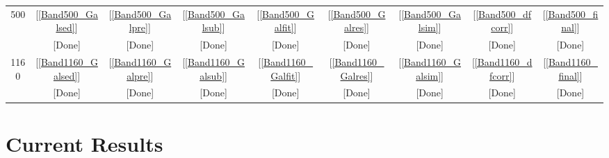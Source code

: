 \documentclass[11pt,a4paper]{article}
\begin{document}
\begin{table}[h]
\begin{tabular}{ccccccccc}
		500 & [\ref{Band500_Galsed}] & [\ref{Band500_Galpre}] & [\ref{Band500_Galsub}] & [\ref{Band500_Galfit}] & [\ref{Band500_Galres}] & [\ref{Band500_Galsim}] & [\ref{Band500_dfcorr}] & [\ref{Band500_final}] \\
		& \textcolor{green!50!black}{[Done]} & \textcolor{green!50!black}{[Done]} & \textcolor{green!50!black}{[Done]} & \textcolor{green!50!black}{[Done]} & \textcolor{green!50!black}{[Done]} & \textcolor{green!50!black}{[Done]} & \textcolor{green!50!black}{[Done]} & \textcolor{green!50!black}{[Done]} \\
		1160 & [\ref{Band1160_Galsed}] & [\ref{Band1160_Galpre}] & [\ref{Band1160_Galsub}] & [\ref{Band1160_Galfit}] & [\ref{Band1160_Galres}] & [\ref{Band1160_Galsim}] & [\ref{Band1160_dfcorr}] & [\ref{Band1160_final}] \\
		& \textcolor{green!50!black}{[Done]} & \textcolor{green!50!black}{[Done]} & \textcolor{green!50!black}{[Done]} & \textcolor{green!50!black}{[Done]} & \textcolor{green!50!black}{[Done]} & \textcolor{green!50!black}{[Done]} & \textcolor{green!50!black}{[Done]} & \textcolor{green!50!black}{[Done]} \\
		\hline
	\end{tabular}
\end{table}


\clearpage

\section{Current Results}
\label{CurrentResults}
\end{document}
